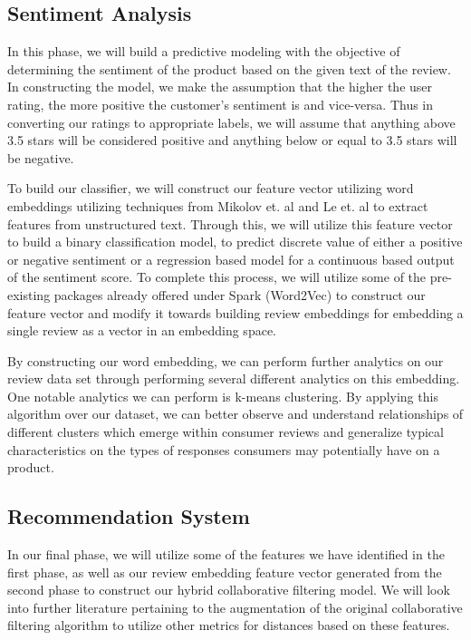 \documentclass[a4paper, 11pt]{article}
\begin{document}
\subsection{Sentiment Analysis}
In this phase, we will build a predictive modeling with the objective of determining the sentiment of the product based on the given text of the review. In constructing the model, we make the assumption that the higher the user rating, the more positive the customer's sentiment is and vice-versa. Thus in converting our ratings to appropriate labels, we will assume that anything above 3.5 stars will be considered positive and anything below or equal to 3.5 stars will be negative.

To build our classifier, we will construct our feature vector utilizing word embeddings utilizing techniques from Mikolov et. al and Le et. al \cite{Mikolov,QuocLe14} to extract features from unstructured text. Through this, we will utilize this feature vector to build a binary classification model, to predict discrete value of either a positive or negative sentiment or a regression based model for a continuous based output of the sentiment score. To complete this process, we will utilize some of the pre-existing packages already offered under Spark (Word2Vec) to construct our feature vector and modify it towards building review embeddings for embedding a single review as a vector in an embedding space.

By constructing our word embedding, we can perform further analytics on our review data set through performing several different analytics on this embedding. One notable analytics we can perform is k-means clustering. By applying this algorithm over our dataset, we can better observe and understand relationships of different clusters which emerge within consumer reviews and generalize typical characteristics on the types of responses consumers may potentially have on a product.

\subsection{Recommendation System}
In our final phase, we will utilize some of the features we have identified in the first phase, as well as our review embedding feature vector generated from the second phase to construct our hybrid collaborative filtering model. We will look into further literature pertaining to the augmentation of the original collaborative filtering algorithm to utilize other metrics for distances based on these features. 
\end{document}
